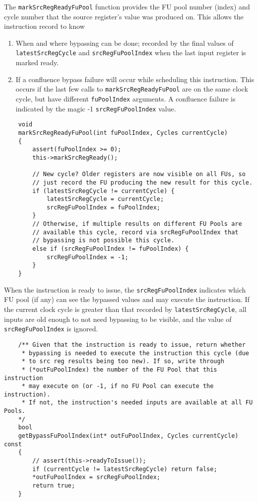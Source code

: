 \documentclass[11pt]{article}
\begin{document}
The \texttt{markSrcRegReadyFuPool} function provides the FU pool
number (index) and cycle number that the source register's value
was produced on. This allows the instruction record to know
\begin{enumerate}
\item When and where bypassing can be done; recorded by the final
  values of \texttt{latestSrcRegCycle} and \texttt{srcRegFuPoolIndex}
  when the last input register is marked ready.
\item If a confluence bypass failure will occur while scheduling this
  instruction. This occurs if the last few calls to
  \texttt{markSrcRegReadyFuPool} are on the same clock cycle, but have
  different \texttt{fuPoolIndex} arguments. A confluence failure is
  indicated by the magic -1 \texttt{srcRegFuPoolIndex} value.
\end{enumerate}
\begin{verbatim}
    void
    markSrcRegReadyFuPool(int fuPoolIndex, Cycles currentCycle)
    {
        assert(fuPoolIndex >= 0);
        this->markSrcRegReady();

        // New cycle? Older registers are now visible on all FUs, so
        // just record the FU producing the new result for this cycle.
        if (latestSrcRegCycle != currentCycle) {
            latestSrcRegCycle = currentCycle;
            srcRegFuPoolIndex = fuPoolIndex;
        }
        // Otherwise, if multiple results on different FU Pools are
        // available this cycle, record via srcRegFuPoolIndex that
        // bypassing is not possible this cycle.
        else if (srcRegFuPoolIndex != fuPoolIndex) {
            srcRegFuPoolIndex = -1;
        }
    }
\end{verbatim}
When the instruction is ready to issue, the \texttt{srcRegFuPoolIndex}
indicates which FU pool (if any) can see the bypassed values and may
execute the instruction. If the current clock cycle is greater than
that recorded by \texttt{latestSrcRegCycle}, all inputs are old enough
to not need bypassing to be visible, and the value of
\texttt{srcRegFuPoolIndex} is ignored.
\begin{verbatim}
    /** Given that the instruction is ready to issue, return whether
     * bypassing is needed to execute the instruction this cycle (due
     * to src reg results being too new). If so, write through
     * (*outFuPoolIndex) the number of the FU Pool that this instruction
     * may execute on (or -1, if no FU Pool can execute the instruction).
     * If not, the instruction's needed inputs are available at all FU Pools.
    */
    bool
    getBypassFuPoolIndex(int* outFuPoolIndex, Cycles currentCycle) const
    {
        // assert(this->readyToIssue());
        if (currentCycle != latestSrcRegCycle) return false;
        *outFuPoolIndex = srcRegFuPoolIndex;
        return true;
    }
\end{verbatim}
\end{document}
